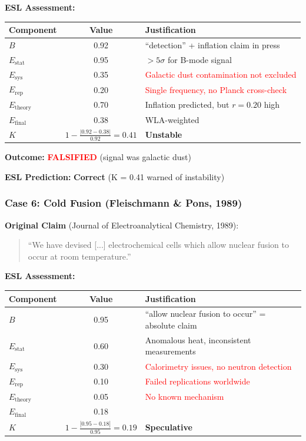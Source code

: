 \documentclass[11pt,a4paper]{article}
\begin{document}
\textbf{ESL Assessment:}
\begin{center}
\begin{tabular}{lcl}
\toprule
\textbf{Component} & \textbf{Value} & \textbf{Justification} \\
\midrule
$B$ & 0.92 & ``detection'' + inflation claim in press \\
$E_{\text{stat}}$ & 0.95 & $>5\sigma$ for B-mode signal \\
$E_{\text{sys}}$ & 0.35 & \textcolor{red}{Galactic dust contamination not excluded} \\
$E_{\text{rep}}$ & 0.20 & \textcolor{red}{Single frequency, no Planck cross-check} \\
$E_{\text{theory}}$ & 0.70 & Inflation predicted, but $r = 0.20$ high \\
\midrule
$E_{\text{final}}$ & 0.38 & WLA-weighted \\
\midrule
$K$ & $1 - \frac{|0.92 - 0.38|}{0.92} = 0.41$ & \textbf{Unstable} \\
\bottomrule
\end{tabular}
\end{center}

\textbf{Outcome:} \textcolor{red}{\textbf{FALSIFIED}} (signal was galactic dust)

\textbf{ESL Prediction:} \checkmark \textbf{Correct} (K = 0.41 warned of instability)

\subsubsection{Case 6: Cold Fusion (Fleischmann \& Pons, 1989)}

\textbf{Original Claim} (Journal of Electroanalytical Chemistry, 1989):
\begin{quote}
``We have devised [...] electrochemical cells which allow nuclear fusion to occur at room temperature.''
\end{quote}

\textbf{ESL Assessment:}
\begin{center}
\begin{tabular}{lcl}
\toprule
\textbf{Component} & \textbf{Value} & \textbf{Justification} \\
\midrule
$B$ & 0.95 & ``allow nuclear fusion to occur'' = absolute claim \\
$E_{\text{stat}}$ & 0.60 & Anomalous heat, inconsistent measurements \\
$E_{\text{sys}}$ & 0.30 & \textcolor{red}{Calorimetry issues, no neutron detection} \\
$E_{\text{rep}}$ & 0.10 & \textcolor{red}{Failed replications worldwide} \\
$E_{\text{theory}}$ & 0.05 & \textcolor{red}{No known mechanism} \\
\midrule
$E_{\text{final}}$ & 0.18 & \\
\midrule
$K$ & $1 - \frac{|0.95 - 0.18|}{0.95} = 0.19$ & \textbf{Speculative} \\
\bottomrule
\end{tabular}
\end{center}
\end{document}
